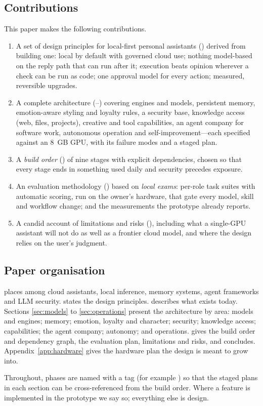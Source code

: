 \subsection{Contributions}

This paper makes the following contributions.
\begin{enumerate}
\item A set of design principles for local-first personal assistants () derived from building one: local by default with governed cloud use; nothing model-based on the reply path that can run after it; execution beats opinion wherever a check can be run as code; one approval model for every action; measured, reversible upgrades.
\item A complete architecture (--) covering engines and models, persistent memory, emotion-aware styling and loyalty rules, a security base, knowledge access (web, files, projects), creative and tool capabilities, an agent company for software work, autonomous operation and self-improvement---each specified against an 8~GB GPU, with its failure modes and a staged plan.
\item A \emph{build order} () of nine stages with explicit dependencies, chosen so that every stage ends in something used daily and security precedes exposure.
\item An evaluation methodology () based on \emph{local exams}: per-role task suites with automatic scoring, run on the owner's hardware, that gate every model, skill and workflow change; and the measurements the prototype already reports.
\item A candid account of limitations and risks (), including what a single-GPU assistant will not do as well as a frontier cloud model, and where the design relies on the user's judgment.
\end{enumerate}

\subsection{Paper organisation}

 places \hivi{} among cloud assistants, local inference, memory systems, agent frameworks and LLM security.  states the design principles.  describes what exists today. Sections \ref{sec:models} to \ref{sec:operations} present the architecture by area: models and engines; memory; emotion, loyalty and character; security; knowledge access; capabilities; the agent company; autonomy; and operations.  gives the build order and dependency graph,  the evaluation plan,  limitations and risks, and  concludes. Appendix~\ref{app:hardware} gives the hardware plan the design is meant to grow into.

Throughout, phases are named with a tag (for example ) so that the staged plans in each section can be cross-referenced from the build order. Where a feature is implemented in the prototype we say so; everything else is design.
